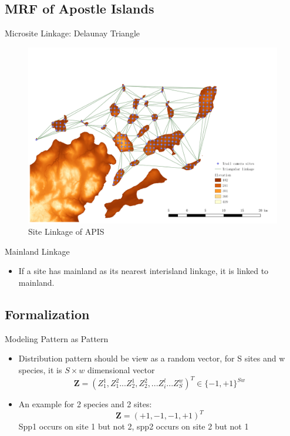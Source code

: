 \documentclass{beamer}
\begin{document}
\subsection{MRF of Apostle Islands} %

\begin{frame}{Microsite Linkage: Delaunay Triangle}
	\begin{figure}[t]
		\includegraphics[scale=0.28]{fig/APIS/APIS_graph.png}
		\caption{Site Linkage of APIS}
		\label{fig_graph}
	\end{figure}
\end{frame} 

\begin{frame}{Mainland Linkage}
	\begin{itemize}
		\item If a site has mainland as its nearest interisland linkage, it is linked to mainland.
	\end{itemize}
\end{frame}

\subsection{Formalization}
\begin{frame}{Modeling Pattern as Pattern}
	\begin{itemize}
		\item Distribution pattern should be view as a random vector, for S sites and w species, it is $S\times w$ dimensional vector
		\[
		\mathbf{Z}=(Z_{1}^{1},Z_{1}^{2}...Z_{2}^{1},Z_{2}^{2},...Z_{i}^{l}...Z_{S}^{w})^{T}\in \{-1,+1\}^{Sw}
		\]
		\item An example for 2 species and 2 sites:
		\[
		\mathbf{Z}=(+1,-1,-1,+1)^{T}
		\]
		Spp1 occurs on site 1 but not 2, spp2 occurs on site 2 but not 1
	\end{itemize}
\end{frame}
\end{document}
